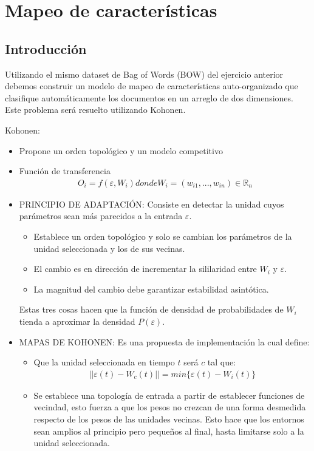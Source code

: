 \newpage
\section{Mapeo de características}

\subsection{Introducción}
Utilizando el mismo dataset de Bag of Words (BOW) del ejercicio anterior debemos construir un modelo de mapeo de características auto-organizado que clasifique automáticamente los 
documentos en un arreglo de dos dimensiones. Este problema será resuelto utilizando Kohonen.

Kohonen:
\begin{itemize}
	\item Propone un orden topológico y un modelo competitivo
	\item Función de transferencia 
				\begin{align*}
					O_{i}=f(\varepsilon, W_{i}) donde W_{i}=(w_{i1}, ..., w_{in}) \in \mathbb{R}_{n}
				\end{align*}
	
	\item PRINCIPIO DE ADAPTACIÓN: Consiste en detectar la unidad cuyos parámetros sean más parecidos a la entrada $\varepsilon$.
		\begin{itemize}
			\item Establece un orden topológico y solo se cambian los parámetros de la unidad seleccionada y los de sus vecinas.
			\item El cambio es en dirección de incrementar la sililaridad entre $W_{i}$ y $\varepsilon$.
			\item La magnitud del cambio debe garantizar estabilidad asintótica.
		\end{itemize}
		Estas tres cosas hacen que la función de densidad de probabilidades de $W_{i}$ tienda a aproximar la densidad $P(\varepsilon)$.
	\item MAPAS DE KOHONEN: Es una propuesta de implementación la cual define:
		\begin{itemize}
			\item Que la unidad seleccionada en tiempo $t$ será $c$ tal que:
				\begin{align*}
					||\varepsilon(t) - W_{c}(t)|| = min\{\varepsilon(t) - W_{i}(t)\}
				\end{align*}
			
			\item Se establece una topología de entrada a partir de establecer funciones de vecindad, esto fuerza a que los pesos no crezcan de una forma desmedida respecto de los 
			pesos de las unidades vecinas. Esto hace que los entornos sean amplios al principio pero pequeños al final, hasta limitarse solo a la unidad seleccionada.
				

\end{itemize}
\end{itemize}
